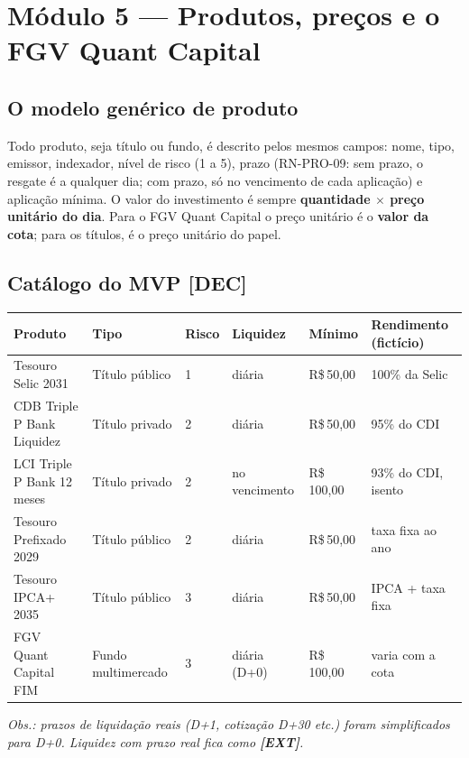 \documentclass[11pt,a4paper]{article}
\newcommand{\banco}{Triple P Bank}            %
\newcommand{\fundo}{FGV Quant Capital}     %
\newcommand{\dec}{\textbf{[DEC]}}          %
\newcommand{\ext}{\textbf{[EXT]}}          %
\newcommand{\rs}{R\$\,}
\begin{document}
\section{Módulo 5 --- Produtos, preços e o \fundo}\label{sec:produtos}

\subsection{O modelo genérico de produto}

Todo produto, seja título ou fundo, é descrito pelos mesmos campos: nome, tipo, emissor,
indexador, nível de risco (1 a 5), prazo (RN-PRO-09: sem prazo, o resgate é a qualquer dia;
com prazo, só no vencimento de cada aplicação) e aplicação mínima. O valor
do investimento é sempre \textbf{quantidade $\times$ preço unitário do dia}. Para o \fundo{} o
preço unitário é o \textbf{valor da cota}; para os títulos, é o preço unitário do papel.

\subsection{Catálogo do MVP \dec}

\begin{longtable}{@{}P{3.9cm}P{2.3cm}P{0.9cm}P{2.0cm}P{1.7cm}P{3.6cm}@{}}
\toprule
\textbf{Produto} & \textbf{Tipo} & \textbf{Risco} & \textbf{Liquidez} & \textbf{Mínimo} & \textbf{Rendimento (fictício)} \\
\midrule
\endhead
Tesouro Selic 2031 & Título público & 1 & diária & \rs 50,00 & 100\% da Selic \\
CDB \banco{} Liquidez & Título privado & 2 & diária & \rs 50,00 & 95\% do CDI \\
LCI \banco{} 12 meses & Título privado & 2 & no vencimento & \rs 100,00 & 93\% do CDI, isento \\
Tesouro Prefixado 2029 & Título público & 2 & diária & \rs 50,00 & taxa fixa ao ano \\
Tesouro IPCA+ 2035 & Título público & 3 & diária & \rs 50,00 & IPCA + taxa fixa \\
\fundo{} FIM & Fundo multimercado & 3 & diária (D+0) & \rs 100,00 & varia com a cota \\
\bottomrule
\end{longtable}

\textit{Obs.: prazos de liquidação reais (D+1, cotização D+30 etc.) foram simplificados para
D+0. Liquidez com prazo real fica como \ext.}
\end{document}
